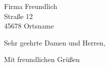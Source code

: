 \documentclass[%
    alignment       = standard,%
    visualize       = false,%
    mainaccentcolor = guardsmanred,%
    otheraccentcolor = gray,%
    layercolor      = black,%
    mainlanguage    = ngerman,%
    verbosedate     = true,%
    verboseplace    = true,%
    refvpos         = 225 pt,%
    toaddrheight    = 92pt,%
]{my-letter}
\begin{document}
\begin{letter}{Firma Freundlich\\Straße 12\\45678 Ortsname}

    \opening{Sehr geehrte Damen und Herren,}

    \kant[1]

    \closing{Mit freundlichen Grüßen}

\end{letter}
\end{document}
